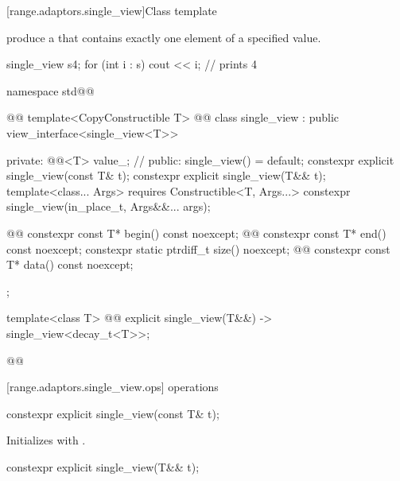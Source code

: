 {[range.adaptors.single_view]{Class template }

\pnum
{}   produce a
 that contains exactly one element of a
specified value.

\pnum
\begin{example}
\begin{codeblock}
single_view s{4};
for (int i : s)
  cout << i; // prints 4
\end{codeblock}
\end{example}

\begin{codeblock}
namespace std@@ { @@
  template<CopyConstructible T>
    @@
  class single_view : public view_interface<single_view<T>> {
  private:
    @@<T> value_; // \expos
  public:
    single_view() = default;
    constexpr explicit single_view(const T& t);
    constexpr explicit single_view(T&& t);
    template<class... Args>
      requires Constructible<T, Args...>
    constexpr single_view(in_place_t, Args&&... args);

    @@
    constexpr const T* begin() const noexcept;
    @@
    constexpr const T* end() const noexcept;
    constexpr static ptrdiff_t size() noexcept;
    @@
    constexpr const T* data() const noexcept;
  };

  template<class T>
    @@
  explicit single_view(T&&) -> single_view<decay_t<T>>;
}@\oldtxt{\}}@
\end{codeblock}

[range.adaptors.single_view.ops]{ operations}

%
\begin{itemdecl}
constexpr explicit single_view(const T& t);
\end{itemdecl}

\begin{itemdescr}
\pnum
\effects Initializes  with .
\end{itemdescr}

%
\begin{itemdecl}
constexpr explicit single_view(T&& t);
\end{itemdecl}

}
